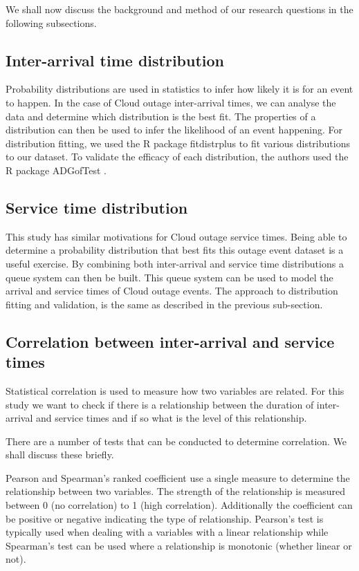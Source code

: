 \documentclass[5p]{elsarticle}
\begin{document}
We shall now discuss the background and method of our research questions in the following subsections.

\subsection{Inter-arrival time distribution}

Probability distributions are used in statistics to infer how likely it is for an event to happen. In the case of Cloud outage inter-arrival times,  we can analyse the data and determine which distribution is the best fit. The properties of a distribution can then be used to infer the likelihood of an event happening. For distribution fitting, we used the R package fitdistrplus \cite{fitdistrplus} to fit various distributions to our dataset. To validate the efficacy of each distribution,  the authors used the R package ADGofTest \cite{ADGoF}. 

\subsection{Service time distribution}

This study has similar motivations for Cloud outage service times. Being able to determine a probability distribution that best fits this outage event dataset is a useful exercise. By combining both inter-arrival and service time distributions a queue system can then be built. This queue system can be used to model the arrival and service times of Cloud outage events. The approach to distribution fitting and validation, is the same as described in the previous sub-section. 

\subsection{Correlation between inter-arrival and service times}

Statistical correlation is used to measure how two variables are related. For this study we want to check if there is a relationship between the duration of inter-arrival and service times and if so what is the level of this relationship. 

There are a number of tests that can be conducted to determine correlation. We shall discuss these briefly.

Pearson \cite{fisher1915frequency} and Spearman's \cite{spearman1904proof} ranked coefficient use a single measure to determine the relationship between two variables. The strength of the relationship is measured between 0 (no correlation) to 1 (high correlation). Additionally the coefficient can be positive or negative indicating the type of relationship. Pearson's test is typically used when dealing with a variables with a linear relationship while Spearman's test can be used where a relationship is monotonic (whether linear or not). 
\end{document}
